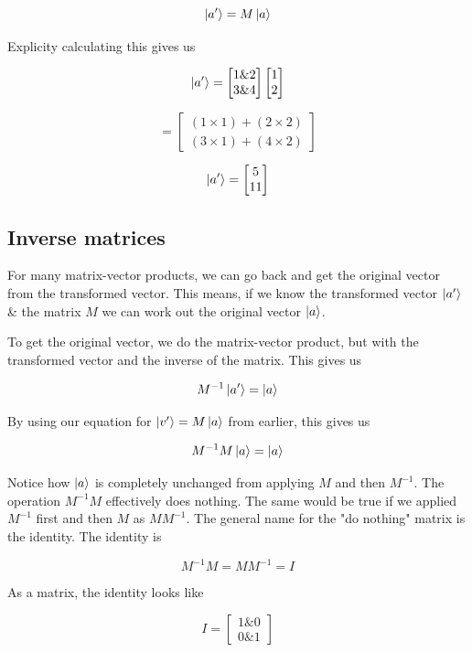 \documentclass{book}
\begin{document}
$$
\ket{a'} = M\ket{a}
$$

Explicity calculating this gives us

$$
\ket{a'} =  \begin{bmatrix} 1 \& 2  \\ 3 \& 4 \end{bmatrix} \begin{bmatrix} 1 \\ 2 \end{bmatrix}
$$

$$
= \begin{bmatrix} (1 \times 1) + (2 \times 2) \\ (3 \times 1) + (4 \times 2) \end{bmatrix}
$$

$$
\ket{a'} = \begin{bmatrix} 5 \\ 11 \end{bmatrix}
$$

\subsection{ Inverse matrices }

For many matrix-vector products, we can go back and get the original vector from the transformed vector. This means, if we know the transformed vector $\ket{a'}$ \&  the matrix $M$ we can work out the original vector $\ket{a}$. 

To get the original vector, we do the matrix-vector product, but with the transformed vector and the inverse of the matrix. This gives us 

$$
M^{-1}\ket{a'} = \ket{a}
$$

By using our equation for $\ket{v'} = M\ket{a}$ from earlier, this gives us 

$$
M^{-1}M\ket{a} = \ket{a}
$$

Notice how $\ket{a}$ is completely unchanged from applying $M$ and then $M^{-1}$. The operation $M^{-1}M$ effectively does nothing. The same would be true if we applied $M^{-1}$ first and then $M$ as $MM^{-1}$. The general name for the "do nothing" matrix is the identity. The identity is

$$M^{-1}M = MM^{-1} = I $$

As a matrix, the identity looks like 

$$ 
I = \begin{bmatrix} 1 \& 0 \\ 0 \& 1 \end{bmatrix}
$$
\end{document}
